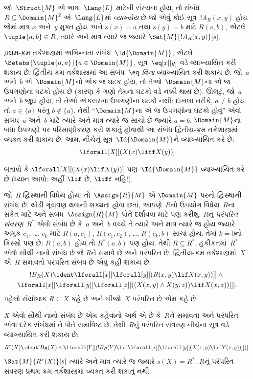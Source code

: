 \begin{defn}
જો~$\Struct{M}$ એ ભાષા~$\Lang{L}$ માટેની સંરચના હોય, તો
સંબંધ~$R \subseteq \Domain{M}^2$ એ~$\Lang{L}$માં \emph{વ્યાખ્યેય}
છે જો એવું કોઈ સૂત્ર~$!A_R(x, y)$ હોય જેમાં માત્ર $x$ અને~$y$
મુક્ત હોય અને $s(x) = a$ તથા $s(y) = b$ માટે $R(a, b)$, એટલે
$\tuple{a,b} \in R$, ત્યારે અને માત્ર ત્યારે જ જ્યારે
$\Sat{M}{!A_R(x, y)}[s]$.
\end{defn}

\begin{ex}
પ્રથમ-ક્રમ તર્કશાસ્ત્રમાં અભિન્નતા સંબંધ~$\Id{\Domain{M}}$, એટલે
$\Setabs{\tuple{a,a}}{a \in
  \Domain{M}}$, સૂત્ર~$\eq[x][y]$ વડે વ્યાખ્યાયિત કરી શકાય છે.
દ્વિતીય-ક્રમ તર્કશાસ્ત્રમાં આ સંબંધ~\emph{$\eq$ વિના} વ્યાખ્યાયિત
કરી શકાય છે. જો~$a$ અને~$b$ એ~$\Domain{M}$નો એક જ ઘટક
હોય, તો તેઓ~$\Domain{M}$ના એ જ ઉપગણોના ઘટકો હોય છે (કારણ
કે ગણો તેમના ઘટકો વડે નક્કી થાય છે). ઊલટું, જો~$a$ અને~$b$
જુદા હોય, તો તેઓ એકસરખા ઉપગણોના ઘટકો નથી: દાખલા તરીકે,
$a \neq b$ હોય તો $a \in \{a\}$ પરંતુ $b
\notin \{a\}$. તેથી ``$\Domain{M}$ના એ જ ઉપગણોના ઘટકો
હોવું'' એવો સંબંધ~$a$ અને~$b$ માટે ત્યારે અને માત્ર ત્યારે જ સાચો
છે જ્યારે $a = b$. $\Domain{M}$ના બધા ઉપગણો પર પરિમાણીકરણ કરી
શકાતું હોવાથી આ સંબંધ દ્વિતીય-ક્રમ તર્કશાસ્ત્રમાં વ્યક્ત કરી શકાય છે.
આમ, નીચેનું
સૂત્ર~$\Id{\Domain{M}}$ને વ્યાખ્યાયિત કરે છે:
\[
\lforall[X][(X(x) \liff X(y))]
\]
\end{ex}

\begin{prob}
બતાવો કે $\lforall[X][(X(x) \lif X(y))]$ પણ~$\Id{\Domain{M}}$
વ્યાખ્યાયિત કરે છે (ધ્યાન આપો: અહીં $\lif$ છે, $\liff$ નહિ!).
\end{prob}

\begin{ex}
જો~$R$ દ્વિસ્થાની વિધેય હોય, તો~$\Assign{R}{M}$ એ
$\Domain{M}$ પરનો દ્વિસ્થાની સંબંધ છે. થોડી ગૂંચવણ થવાની શક્યતા
હોવા છતાં, આપણે~$R$નો ઉપયોગ વિધેય~$R$ના સંકેત માટે અને
સંબંધ~$\Assign{R}{M}$ પોતે દર્શાવવા માટે પણ કરીશું. $R$નું
\emph{પરંપરિત સંવરણ}~$R^*$ એવો સંબંધ છે કે~$a$ અને~$b$ વચ્ચે તે
ત્યારે અને માત્ર ત્યારે જ હોય જ્યારે અમુક $c_1$, \dots, $c_k$
માટે $R(a,c_1)$, $R(c_1, c_2)$, \dots, $R(c_k,b)$ સાચાં હોય.
તેમાં $k = 0$નો કિસ્સો પણ છે: $R(a,b)$ હોય તો $R^*(a,b)$ પણ હોય.
તેથી $R \subseteq R^*$. હકીકતમાં~$R^*$ એવો સૌથી નાનો સંબંધ છે જે
$R$ને સમાવે છે અને પરંપરિત છે. દ્વિતીય-ક્રમ તર્કશાસ્ત્રમાં~$X$ એ~$R$
સમાવતો પરંપરિત સંબંધ છે એવું કહી શકાય છે:
\begin{multline*}
  !B_R(X) \ident \lforall[x][\lforall[y][(R(x,y) \lif X(x, y))]] \land {}\\
\lforall[x][\lforall[y][\lforall[z][((X(x,y) \land X(y,z)) \lif X(x,
      z))]]].
\end{multline*}
પહેલો સંયોજક $R \subseteq X$ કહે છે અને બીજો~$X$ પરંપરિત છે એમ કહે
છે.

$X$ એવો સૌથી નાનો સંબંધ છે એમ કહેવાનો અર્થ એ છે કે~$R$ને સમાવતા
અને પરંપરિત એવા દરેક સંબંધમાં તે પોતે સમાવિષ્ટ છે. તેથી~$R$નું
પરંપરિત સંવરણ નીચેના સૂત્ર વડે વ્યાખ્યાયિત કરી શકાય છે:
\[
R^*(X) \ident !B_R(X) \land \lforall[Y][(!B_R(Y) \lif
  \lforall[x][\lforall[y][(X(x, y) \lif Y(x,y))]])].
\]
$\Sat{M}{R^*(X)}[s]$ ત્યારે અને માત્ર ત્યારે જ જ્યારે $s(X) = R^*$.
$R$નું પરંપરિત સંવરણ પ્રથમ-ક્રમ તર્કશાસ્ત્રમાં વ્યક્ત કરી શકાતું નથી.
\end{ex}
\endgroup


